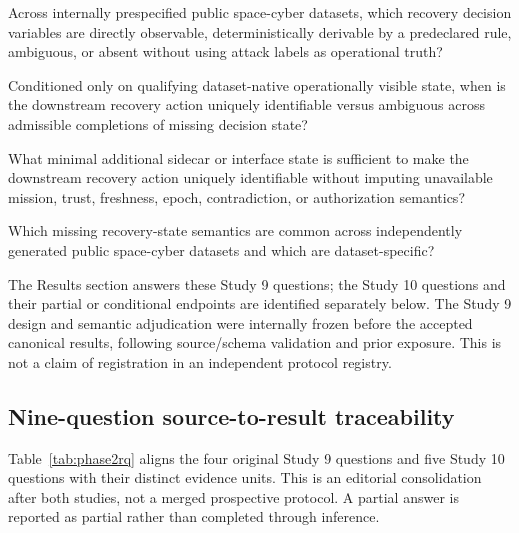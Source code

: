 \documentclass[preprint,12pt]{elsarticle}
\begin{document}
\begin{description}[leftmargin=1.15cm,labelwidth=0.95cm,style=nextline]
    \item[RQ1] Across internally prespecified public space-cyber datasets, which recovery decision variables are directly observable, deterministically derivable by a predeclared rule, ambiguous, or absent without using attack labels as operational truth?
    \item[RQ2] Conditioned only on qualifying dataset-native operationally visible state, when is the downstream recovery action uniquely identifiable versus ambiguous across admissible completions of missing decision state?
    \item[RQ3] What minimal additional sidecar or interface state is sufficient to make the downstream recovery action uniquely identifiable without imputing unavailable mission, trust, freshness, epoch, contradiction, or authorization semantics?
    \item[RQ4] Which missing recovery-state semantics are common across independently generated public space-cyber datasets and which are dataset-specific?
\end{description}

The Results section answers these Study 9 questions; the Study 10 questions and their partial or conditional endpoints are identified separately below. The Study 9 design and semantic adjudication were internally frozen before the accepted canonical results, following source/schema validation and prior exposure. This is not a claim of registration in an independent protocol registry.

\subsection{Nine-question source-to-result traceability}
\label{sec:phase2rq}
Table~\ref{tab:phase2rq} aligns the four original Study 9 questions and five Study 10 questions with their distinct evidence units. This is an editorial consolidation after both studies, not a merged prospective protocol. A partial answer is reported as partial rather than completed through inference.
\end{document}
